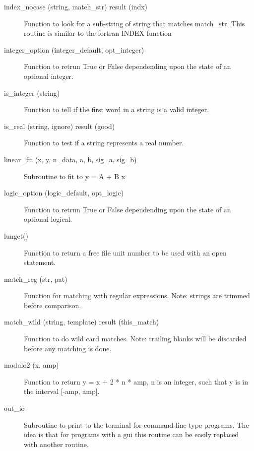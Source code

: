 \begin{description}
\item[index_nocase (string, match_str) result (indx)] \Newline 
Function to look for a sub-string of string that matches match_str.
This routine is similar to the fortran INDEX function

\item[integer_option (integer_default, opt_integer)] \Newline 
Function to retrun True or False dependending upon the state of an 
optional integer.

\item[is_integer (string)] \Newline 
Function to tell if the first word in a string is a valid integer.

\item[is_real (string, ignore) result (good)] \Newline 
Function to test if a string represents a real number.

\item[linear_fit (x, y, n_data, a, b, sig_a, sig_b)] \Newline 
Subroutine to fit to y = A + B x

\item[logic_option (logic_default, opt_logic)] \Newline 
Function to retrun True or False dependending upon the state of an 
optional logical.

\item[lunget()] \Newline 
Function to return a free file unit number to be used with an open statement.

\item[match_reg (str, pat)] \Newline 
Function for matching with regular expressions.
Note: strings are trimmed before comparison.

\item[match_wild (string, template) result (this_match)] \Newline 
Function to do wild card matches. Note: trailing blanks will be discarded
before any matching is done.

\item[modulo2 (x, amp)] \Newline 
Function to return y = x + 2 * n * amp, n is an integer, such that y is 
in the interval [-amp, amp].

\item[out_io] \Newline 
Subroutine to print to the terminal for command line type programs.
The idea is that for programs with a gui this routine can be easily
replaced with another routine.


\end{description}
